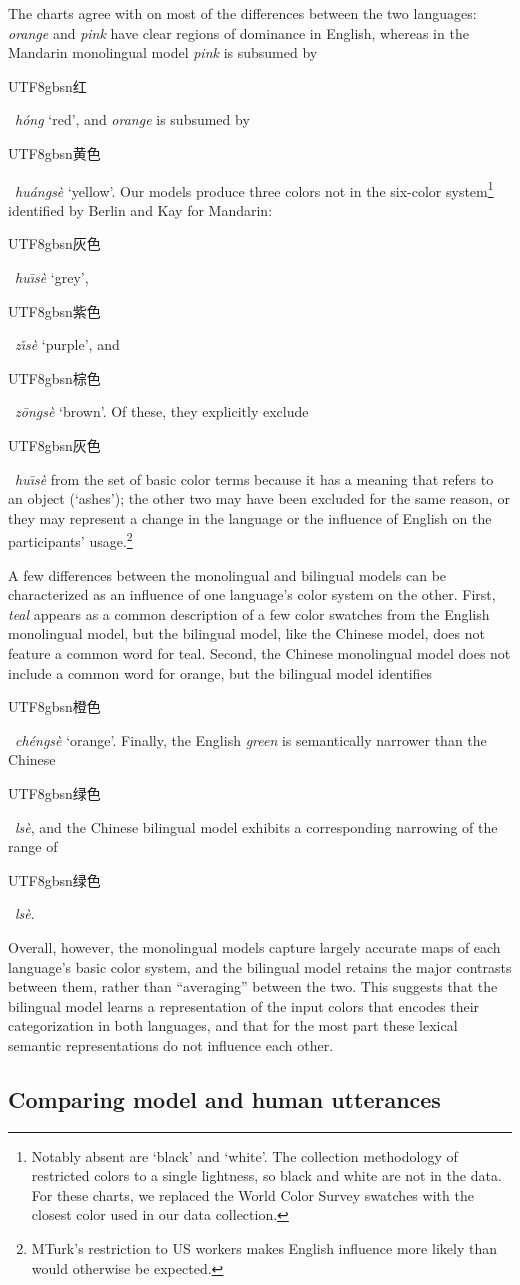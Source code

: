 \documentclass[11pt,a4paper]{article}
\newenvironment{zh}{\begin{CJK}{UTF8}{gbsn}}{\end{CJK}}
\newcommand{\textzh}[2]{\begin{zh}#1\end{zh}~\emph{#2}}
\renewcommand{\|}{\mid}
\begin{document}
The charts agree with \citet{BerlinKay1969} on most of the differences between the two languages:
\emph{orange} and \emph{pink} have clear regions of dominance in English, whereas in the Mandarin
monolingual model \emph{pink} is subsumed by \textzh{红}{h\'ong} `red', and \emph{orange} is subsumed by \textzh{黄色}{hu\'angs\`e} `yellow'. Our models produce three colors not in the six-color system\footnote{Notably absent are `black' and `white'. The collection methodology of \citet{Monroe2017} restricted colors to a single lightness, so black and white are not in the data. For these charts, we replaced the World Color Survey swatches with the closest color used in our data collection.} identified by Berlin and Kay for Mandarin: \textzh{灰色}{hu\={\i}s\`e} `grey', \textzh{紫色}{z\v{\i}s\`e} `purple', and \textzh{棕色}{z\=ongs\`e} `brown'. Of these, they explicitly exclude \textzh{灰色}{hu\={\i}s\`e} from the set of basic color terms because it has a meaning that refers to an object (`ashes'); the other two may have been excluded for the same reason, or they may represent a change in the language or the influence of English on the participants' usage.\footnote{MTurk's restriction to US workers makes English influence more likely than would otherwise be expected.}

A few differences between the monolingual and bilingual models can be characterized as an influence of
one language's color system on the other. First, \emph{teal} appears as a common description of a few color 
swatches from the English monolingual model, but the bilingual model, like the Chinese model, does not feature 
a common word for teal. Second, the Chinese monolingual model does not include a common word for orange, but
the bilingual model identifies \textzh{橙色}{ch\'engs\`e} `orange'. Finally, the English 
\emph{green} is semantically narrower than the Chinese \textzh{绿色}{ls\`e}, and the
Chinese bilingual model exhibits a corresponding narrowing of the range of 
\textzh{绿色}{ls\`e}.

Overall, however, the monolingual models capture largely accurate maps of each language's
basic color system, and the bilingual model retains the major contrasts between them, 
rather than ``averaging'' between the two. This suggests that
the bilingual model learns a representation of the input colors that
encodes their categorization in both languages, and that for the most part these
lexical semantic representations do not influence each other.

\subsection{Comparing model and human utterances}
\end{document}

